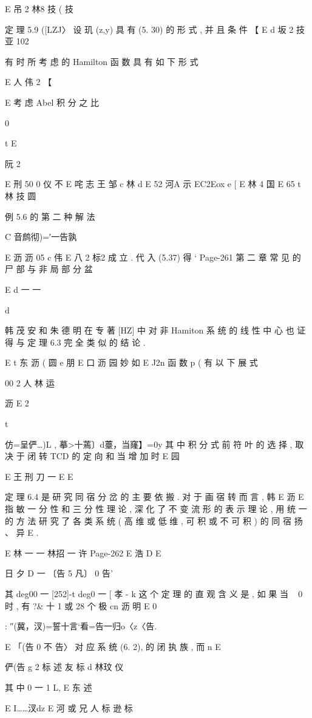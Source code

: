 {{{{{{{{{{{{{{{E 吊 2 林8 技 ( 技

定 理 5.9 ([LZJ〉 设 玑 (z,y) 具 有 (5. 30) 的 形 式 , 并 且 条 件
【
E d 坂 2 技 亚 102

有 时 所 考 虑 的 Hamilton 函 数 具 有 如 下 形 式

E 人 伟 2 【

E
考 虑 Abel 积 分 之 比

0

t E

阮 2

E 刑 50
0 仪 不
E 咤 志 王
邹 c 林 d
E 52 河A 示 EC2Eox e
[
E 林 4 国
E 65
t 林 技 圆

例 5.6 的 第 二 种 解 法

C 音鹧彻)=′一告孰

E 沥 沥 05 c 伟
E 八 2 标2
成 立 . 代 入 (5.37) 得 `
Page-261
第 二 章 常 见 的 尸 部 与 非 局 部 分 盆

E d 一 一

d

韩 茂 安 和 朱 德 明 在 专 著 [HZ] 中 对 非 Hamiton 系 统 的 线 性 中
心 也 证 得 与 定 理 6.3 完 全 类 似 的 结 论 .

E t 东 沥 ( 圆 e 朋
E 口 沥 园 妙 如
E J2n
函 数 p ( 有 以 下 展 式

00 2 人 林 运

沥
E
2

t

仿=呈俨…)L , 摹>十蔫〕d薹，当窿】=0y
其 中 积 分 式 前 符 叶 的 选 择 , 取 决 于 闭 转 TCD 的 定 向 和 当 增 加 时
E 园

E 王 刑 刀 一
E
E

定 理 6.4 是 研 究 同 宿 分 岔 的 主 要 依 搬 . 对 于 画 宿 转 而 言 , 韩
E 沥
E
指 敏 一 分 性 和 三 分 性 理 论 , 深 化 了 不 变 流 形 的 表 示 理 论 , 用 统 一 的
方 法 研 究 了 各 类 系 统 ( 高 维 或 低 维 , 可 积 或 不 可 积 ) 的 同 宿 扬 、 异
E .

E 林 一 一
林招 一 许
Page-262
E 浩 D E

日
夕 D 一 〔告 5 凡〕 0 告'

其 deg00 一 [252]-t deg0 一 [ 孝 - k
这 个 定 理 的 直 观 含 义 是 , 如 果 当 ~ 0 时 , 有 ?& 十 1 或 28 个 极
cn 沥 明
E
0

:
″(冀，汊)=誓十言`看=告一归o〈z〈告.

E 「(告 0 不 告〉 对 应 系 统 (6. 2), 的 闭 执 族 , 而
n
E

俨(告 g 2 标 述 友 标 d 林玟 仪

其 中 0 一 1 L,
E 东 述

E I……汊dz E 河 或 兄 人 标 逊 标

}}}}}}}}}}}}}}}
